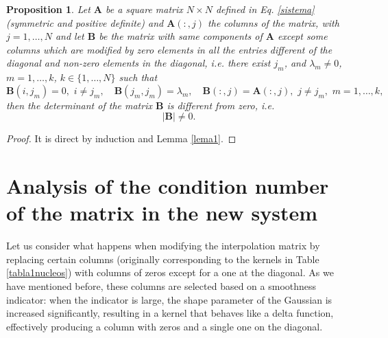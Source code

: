 \documentclass[preprint]{elsarticle}       %
\newtheorem{proposition}[theorem]{Proposition}
\newtheorem{proof}{Proof}
[section]
\begin{document}
\begin{proposition}\label{prop1}
Let $\mathbf{A}$ be a square matrix $N\times N$ defined in Eq. \eqref{sistema} (symmetric and positive definite) and $\mathbf{A}(:,j)$ the columns of the matrix, with $j=1,\hdots,N$ and let $\mathbf{B}$ be the matrix with same components of $\mathbf{A}$ except some columns  which are modified by zero elements in all the entries different of the diagonal and non-zero elements in the diagonal, i.e. there exist $j_m$, and $\lambda_m\neq 0$, $m=1,\dots,k$, $k\in\{1,\dots,N\}$ such that
$$\mathbf{B}(i,j_m)=0,\,\, i\neq j_m, \quad \mathbf{B}(j_m,j_m)=\lambda_m,\quad \mathbf{B}(:,j)=\mathbf{A}(:,j),\,\, j\neq j_m,\,\,m=1,\dots,k,$$
then the determinant of the matrix $\mathbf{B}$ is different from zero, i.e.
$$|\mathbf{B}|\neq 0.$$
\end{proposition}
\begin{proof}
It is direct by induction and Lemma \ref{lema1}.
\end{proof}



\section{Analysis of the condition number of the matrix in the new system} %

Let us consider what happens when modifying the interpolation matrix by replacing certain columns (originally corresponding to the kernels in Table \ref{tabla1nucleos}) with columns of zeros except for a one at the diagonal. As we have mentioned before, these columns are selected based on a smoothness indicator: when the indicator is large, the shape parameter of the Gaussian is increased significantly, resulting in a kernel that behaves like a delta function, effectively producing a column with zeros and a single one on the diagonal.
\end{document}
